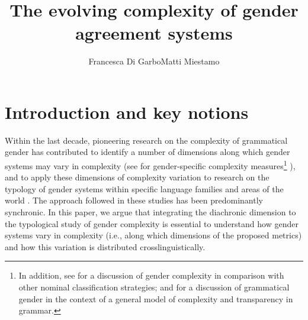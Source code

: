 \documentclass[output=collectionpaper]{langsci/langscibook}
\author{Francesca {Di Garbo}\affiliation{Stockholm University}\lastand Matti Miestamo\affiliation{University of Helsinki}}%
\title{The evolving complexity of gender agreement systems}
\begin{document}
\maketitle


\section{Introduction and key notions}
\label{intro2}
Within the last decade, pioneering research on the complexity of grammatical gender has contributed to identify a number of dimensions along which gender systems may vary in complexity (see \citealt{Audring2014,Audring2017,DiGarbo2016} for gender-specific complexity measures\footnote{In%
  addition, see \citet{Passer2016b} for a discussion of gender complexity in comparison with other nominal classification strategies; and \citet{Leufkens2015} for a discussion of grammatical gender in the context of a general model of complexity and transparency in grammar.}%
), and to apply these dimensions of complexity variation to research on the typology of gender systems within specific language families and areas of the world \citep{DiGarbo2016}. The approach followed in these studies has been predominantly synchronic. In this paper, we argue that integrating the diachronic dimension to the typological study of gender complexity is essential to understand how gender systems vary in complexity (i.e., along which dimensions of the proposed metrics) and how this variation is distributed crosslinguistically.
\end{document}
